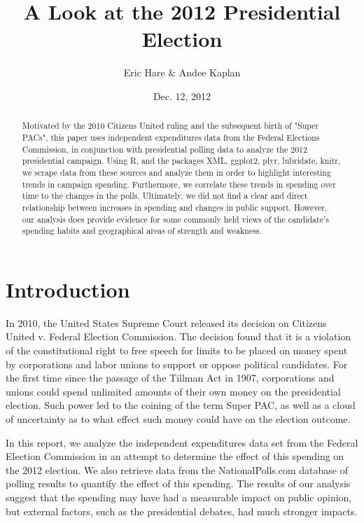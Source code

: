 \documentclass[11pt]{article}\usepackage{graphicx, color}
\begin{document}
\setlength{\parskip}{3ex}
\setlength{\parindent}{0pt}

\title{A Look at the 2012 Presidential Election}
\author{Eric Hare \& Andee Kaplan}
\date{Dec. 12, 2012}

\thispagestyle{empty}
\maketitle
\begin{abstract}
Motivated by the 2010 Citizens United ruling and the subsequent birth of "Super PACs", this paper uses independent expenditures data from the Federal Elections Commission, in conjunction with presidential polling data to analyze the 2012 presidential campaign. Using R, and the packages XML, ggplot2, plyr, lubridate, knitr, we scrape data from these sources and analyze them in order to highlight interesting trends in campaign spending. Furthermore, we correlate these trends in spending over time to the changes in the polls. Ultimately, we did not find a clear and direct relationship between increases in spending and changes in public support. However, our analysis does provide evidence for some commonly held views of the candidate's spending habits and geographical areas of strength and weakness.
\end{abstract}
\clearpage

\setcounter{page}{1}
\section{Introduction}
In 2010, the United States Supreme Court released its decision on Citizens United v. Federal Election Commission. The decision found that it is a violation of the constitutional right to free speech for limits to be placed on money spent by corporations and labor unions to support or oppose political candidates. For the first time since the passage of the Tillman Act in 1907, corporations and unions could spend unlimited amounts of their own money on the presidential election. Such power led to the coining of the term Super PAC, as well as a cloud of uncertainty as to what effect such money could have on the election outcome.

In this report, we analyze the independent expenditures data set from the Federal Election Commission in an attempt to determine the effect of this spending on the 2012 election. We also retrieve data from the NationalPolls.com database of polling results to quantify the effect of this spending. The results of our analysis suggest that the spending may have had a measurable impact on public opinion, but external factors, such as the presidential debates, had much stronger impacts.
\end{document}
